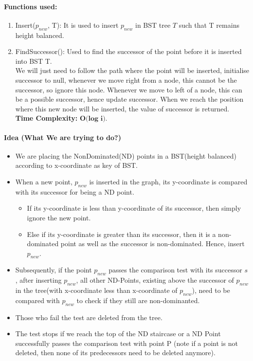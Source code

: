 \documentclass[pdftex,a4paper,12pt]{report}
\begin{document}
\paragraph{Functions used:} 
\begin{enumerate}
 \item
 Insert($p_{new}$, T): It is used to insert $p_{new}$ in BST tree $T$ such that T remains height balanced.
 \item 
  FindSuccessor(): Used to find the successor of the point before it is inserted into BST T. \\
\makebox[40pt]{}We will just need to follow the path where the point will be inserted, initialise successor to null, 
whenever we move right from a node, this cannot be the successor,
so ignore this node. Whenever we move to left of a node, this can be a possible successor, hence update successor. When we reach the
position where this new node will be inserted, the value of successor is returned. \\
\textbf{Time Complexity:} $\textbf{O(log i)}$.
\end{enumerate}
\paragraph{Idea (What We are trying to do?)} \makebox[2pt]{}
\begin{itemize}
 \item We are placing the NonDominated(ND) points in a BST(height balanced) according to x-coordinate as key of BST.
 \item When a new point, $p_{new}$ is inserted in the graph, its y-coordinate is compared with its successor for being a ND point.
    \begin{itemize}
    \item If its y-coordinate is less than y-coordinate of its successor, then simply ignore the new point. 
    \item Else if its y-coordinate is greater than its successor, then it is a non-dominated point as well as the successor is non-dominated. Hence, 
    insert $p_{new}$.
    \end{itemize}
 \item Subsequently, if the point $p_{new}$ passes the comparison test with its successor $s$, after inserting $p_{new}$, all other ND-Points,
 existing above the successor of $p_{new}$ in the tree(with x-coordinate less than x-coordinate of $p_{new}$),
 need to be compared with $p_{new}$ to check if they still are non-dominanted.
 \item Those who fail the test are deleted from the tree.
 \item The test stops if we reach the top of the ND staircase or a ND Point successfully passes the comparison test with point P
 (note if a point is not deleted, then none of its predecessors need to be deleted anymore).
\end{itemize}
\end{document}
